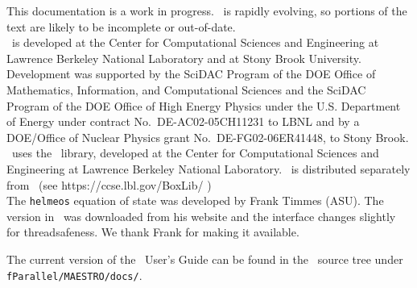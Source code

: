 This documentation is a work in progress.  \maestro\ is rapidly
evolving, so portions of the text are likely to be incomplete or
out-of-date. \\

\noindent \maestro\ is developed at the Center for Computational Sciences and
Engineering at Lawrence Berkeley National Laboratory and at Stony
Brook University.  Development was supported by the SciDAC Program of
the DOE Office of Mathematics, Information, and Computational Sciences
and the SciDAC Program of the DOE Office of High Energy Physics under
the U.S. Department of Energy under contract No.\ DE-AC02-05CH11231 to
LBNL and by a DOE/Office of Nuclear Physics grant No.\
DE-FG02-06ER41448, to Stony Brook.  \\

\noindent \maestro\ uses the \boxlib\ library,
developed at the Center for Computational Sciences and
Engineering at Lawrence Berkeley National Laboratory.  \boxlib\
is distributed separately from \maestro\ (see https:/\hspace{-0.25em}/ccse.lbl.gov/BoxLib/ )
\\

\noindent The {\tt helmeos} equation of state was developed by Frank Timmes (ASU).
The version in \maestro\ was downloaded from his website and the
interface changes slightly for threadsafeness.  We thank Frank for
making it available.

\noindent The current version of the \maestro\ User's Guide can be found in 
the \maestro\ source tree under {\tt fParallel/MAESTRO/docs/}.
